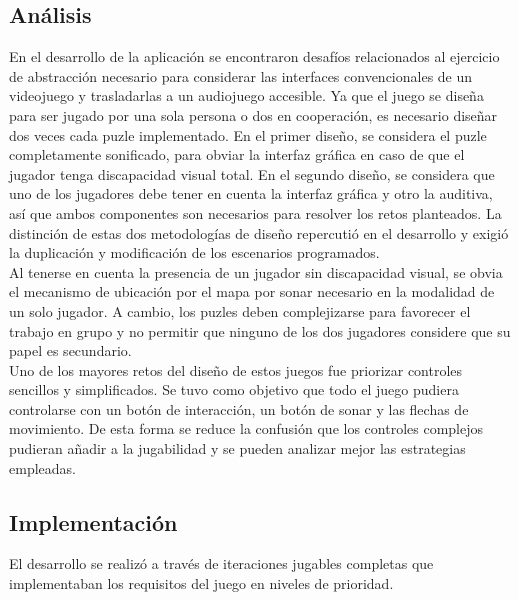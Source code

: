 \subsection{Análisis}
En el desarrollo de la aplicación se encontraron desafíos relacionados al ejercicio de abstracción necesario para considerar las interfaces convencionales de un videojuego y trasladarlas a un audiojuego accesible. Ya que el juego se diseña para ser jugado por una sola persona o dos en cooperación, es necesario diseñar dos veces cada puzle implementado. En el primer diseño, se considera el puzle completamente sonificado, para obviar la interfaz gráfica en caso de que el jugador tenga discapacidad visual total. En el segundo diseño, se considera que uno de los jugadores debe tener en cuenta la interfaz gráfica y otro la auditiva, así que ambos componentes son necesarios para resolver los retos planteados. La distinción de estas dos metodologías de diseño repercutió en el desarrollo y exigió la duplicación y modificación de los escenarios programados. \\

Al tenerse en cuenta la presencia de un jugador sin discapacidad visual, se obvia el mecanismo de ubicación por el mapa por sonar necesario en la modalidad de un solo jugador. A cambio, los puzles deben complejizarse para favorecer el trabajo en grupo y no permitir que ninguno de los dos jugadores considere que su papel es secundario.\\

Uno de los mayores retos del diseño de estos juegos fue priorizar controles sencillos y simplificados. Se tuvo como objetivo que todo el juego pudiera controlarse con un botón de interacción, un botón de sonar y las flechas de movimiento. De esta forma se reduce la confusión que los controles complejos pudieran añadir a la jugabilidad y se pueden analizar mejor las estrategias empleadas.\\
\subsection{Implementación}
El desarrollo se realizó a través de iteraciones jugables completas que implementaban los requisitos del juego en niveles de prioridad.
